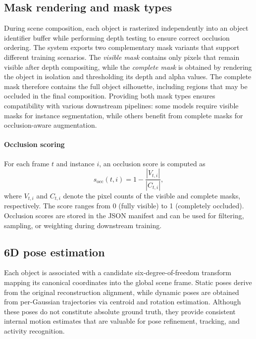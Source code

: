 \subsection{Mask rendering and mask types}
During scene composition, each object is rasterized independently into an object identifier buffer while performing depth testing to ensure correct occlusion ordering. The system exports two complementary mask variants that support different training scenarios. The \emph{visible mask} contains only pixels that remain visible after depth compositing, while the \emph{complete mask} is obtained by rendering the object in isolation and thresholding its depth and alpha values. The complete mask therefore contains the full object silhouette, including regions that may be occluded in the final composition. Providing both mask types ensures compatibility with various downstream pipelines: some models require visible masks for instance segmentation, while others benefit from complete masks for occlusion-aware augmentation.

\paragraph{Occlusion scoring}
For each frame \(t\) and instance \(i\), an occlusion score is computed as
\[
s_{\mathrm{occ}}(t,i) = 1 - \frac{|V_{t,i}|}{|C_{t,i}|},
\]
where \(V_{t,i}\) and \(C_{t,i}\) denote the pixel counts of the visible and complete masks, respectively. The score ranges from 0 (fully visible) to 1 (completely occluded). Occlusion scores are stored in the JSON manifest and can be used for filtering, sampling, or weighting during downstream training.

\subsection{6D pose estimation}
Each object is associated with a candidate six-degree-of-freedom transform mapping its canonical coordinates into the global scene frame. Static poses derive from the original reconstruction alignment, while dynamic poses are obtained from per-Gaussian trajectories via centroid and rotation estimation. Although these poses do not constitute absolute ground truth, they provide consistent internal motion estimates that are valuable for pose refinement, tracking, and activity recognition.

